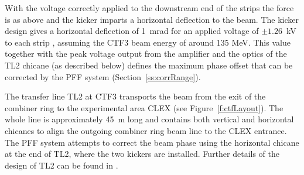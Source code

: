 With the voltage correctly applied to the downstream end of the strips the force is as above and the kicker imparts a horizontal deflection to the beam. The kicker design gives a horizontal deflection of 1~mrad for an applied voltage of \(\pm1.26\)~kV to each strip \cite{kickerIPAC11}, assuming the CTF3 beam energy of around 135 MeV. This value together with the peak voltage output from the amplifier and the optics of the TL2 chicane (as described below) defines the maximum phase offset that can be corrected by the PFF system (Section~\ref{ss:corrRange}).




The transfer line TL2 at CTF3 transports the beam from the exit of the combiner ring to the experimental area CLEX (see Figure~\ref{f:ctfLayout}). The whole line is approximately 45~m long and contains both vertical and horizontal chicanes to align the outgoing combiner ring beam line to the CLEX entrance. The PFF system attempts to correct the beam phase using the horizontal chicane at the end of TL2, where the two kickers are installed. Further details of the design of TL2 can be found in \cite{tl2}.



